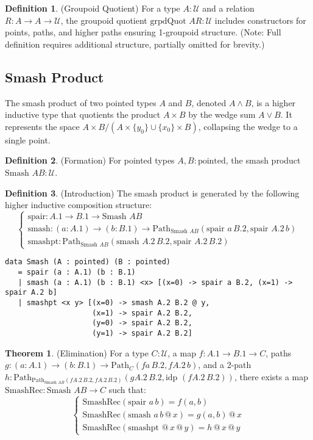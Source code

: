 \documentclass{article}
\theoremstyle{definition}
\newtheorem{theorem}{Theorem}
\newtheorem{definition}{Definition}
\begin{document}
\begin{definition} (Groupoid Quotient)
For a type $A : \mathcal{U}$ and a relation $R : A \to A \to \mathcal{U}$, the groupoid quotient $\text{grpdQuot } A R : \mathcal{U}$ includes constructors for points, paths, and higher paths ensuring 1-groupoid structure. (Note: Full definition requires additional structure, partially omitted for brevity.)
\end{definition}


\newpage
\subsection{Smash Product}
The smash product of two pointed types $A$ and $B$, denoted $A \wedge B$,
is a higher inductive type that quotients the product $A \times B$ by the
wedge sum $A \vee B$. It represents the space $A \times B / (A \times \{ y_0 \} \cup \{ x_0 \} \times B)$,
collapsing the wedge to a single point.

\begin{definition} (Formation)
For pointed types $A, B : \text{pointed}$, the smash product $\text{Smash } A B : \mathcal{U}$.
\end{definition}

\begin{definition} (Introduction)
The smash product is generated by the following higher inductive composition structure:
\[
\begin{cases}
\text{spair} : A.1 \to B.1 \to \text{Smash } A B \\
\text{smash} : (a : A.1) \to (b : B.1) \to \text{Path}_{\text{Smash } A B} (\text{spair } a \, B.2, \text{spair } A.2 \, b) \\
\text{smashpt} : \text{Path}_{\text{Smash } A B} (\text{smash } A.2 \, B.2, \text{spair } A.2 \, B.2)
\end{cases}
\]
\begin{lstlisting}
data Smash (A : pointed) (B : pointed)
   = spair (a : A.1) (b : B.1)
   | smash (a : A.1) (b : B.1) <x> [(x=0) -> spair a B.2, (x=1) -> spair A.2 b]
   | smashpt <x y> [(x=0) -> smash A.2 B.2 @ y,
                    (x=1) -> spair A.2 B.2,
                    (y=0) -> spair A.2 B.2,
                    (y=1) -> spair A.2 B.2]
\end{lstlisting}
\end{definition}

\begin{theorem} (Elimination)
For a type $C : \mathcal{U}$, a map $f : A.1 \to B.1 \to C$,
paths $g : (a : A.1) \to (b : B.1) \to \text{Path}_C (f a \, B.2, f A.2 \, b)$,
and a 2-path $h : \text{Path}_{\text{Path}_{\text{Smash } A B} (f A.2 \, B.2, f A.2 \, B.2)} (g A.2 \, B.2, \text{idp } (f A.2 \, B.2))$,
there exists a map $\text{SmashRec} : \text{Smash } A B \to C$ such that:
\[
\begin{cases}
\text{SmashRec}(\text{spair } a \, b) = f(a, b) \\
\text{SmashRec}(\text{smash } a \, b \, @ \, x) = g(a, b) \, @ \, x \\
\text{SmashRec}(\text{smashpt } @ \, x \, @ \, y) = h \, @ \, x \, @ \, y
\end{cases}
\]
\end{theorem}
\end{document}
